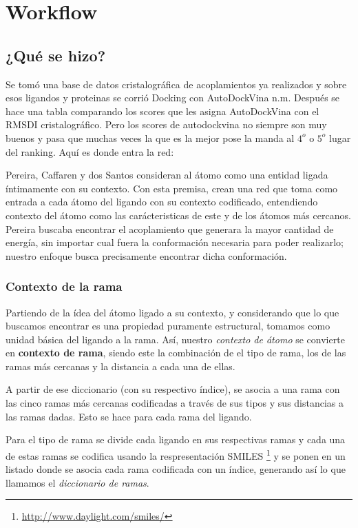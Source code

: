 \section{Workflow}
\subsection{¿Qué se hizo?}
Se tomó una base de datos cristalográfica de acoplamientos ya
realizados y sobre esos ligandos y proteinas se corrió Docking con
AutoDockVina n.m. Después se hace una tabla comparando los scores que
les asigna AutoDockVina con el RMSDI cristalográfico. Pero los scores
de autodockvina no siempre son muy buenos y pasa que muchas veces la
que es la mejor pose la manda al $4^o$ o $5^o$ lugar del ranking.
Aquí es donde entra la red:

Pereira, Caffaren y dos Santos \cite{dossantos} consideran al átomo
como una entidad ligada íntimamente con su contexto. Con esta premisa,
crean una red que toma como entrada a cada átomo del ligando con su
contexto codificado, entendiendo contexto del átomo como las
carácteristicas de este y de los átomos más cercanos.
Pereira buscaba encontrar el acoplamiento que generara la mayor
cantidad de energía, sin importar cual fuera la conformación necesaria
para poder realizarlo; nuestro enfoque busca precisamente encontrar
dicha conformación.

\subsubsection{Contexto de la rama}
Partiendo de la ídea del átomo ligado a su contexto, y considerando
que lo que buscamos encontrar es una propiedad puramente estructural,
tomamos como unidad básica del ligando a la rama. Así, nuestro
\textit{contexto de átomo} se convierte en \textbf{contexto de rama},
siendo este la combinación de el tipo de rama, los de las ramas más
cercanas y la distancia a cada una de ellas.

A partir de ese diccionario (con su respectivo índice), se asocia a
una rama con las cinco ramas más cercanas codificadas a través de sus
tipos y sus distancias a las ramas dadas. Esto se hace para cada rama
del ligando.

Para el tipo de rama se divide cada ligando en sus respectivas ramas y
cada una de estas ramas se codifica usando la respresentación
SMILES \footnote{\url{http://www.daylight.com/smiles/}} y se ponen en
un listado donde se asocia cada rama codificada con un índice,
generando así lo que llamamos el \textit{diccionario de ramas}.

